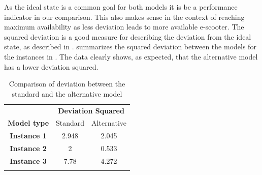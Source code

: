 As the ideal state is a common goal for both models it is be a performance indicator in our comparison. This also makes sense in the context of reaching maximum availability as less deviation leads to more available e-scooter. The squared deviation is a good measure for describing the deviation from the ideal state, as described in .  summarizes the squared deviation between the models for the instances in . The data clearly shows, as expected, that the alternative model has a lower deviation squared. 
\\
\begin{table}[H]
    \centering
    \caption{Comparison of deviation between the standard and the alternative model}
    \begin{tabular}{c c c}
        \thickhline
        & \multicolumn{2}{c}{\textbf{Deviation Squared}}  \\
        \thickhline
        \textbf{Model type} & Standard & Alternative \\
        \hline
        \textbf{Instance 1} & 2.948 & 2.045 \\
        \textbf{Instance 2} & 2 & 0.533 \\
        \textbf{Instance 3} & 7.78 & 4.272 \\
        \thickhline
    \end{tabular}
    \label{deviation_comparison_a_and_s}
\end{table}

